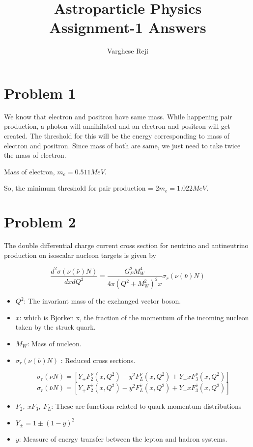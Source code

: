 \documentclass[a4paper,11pt]{article}
\author{Varghese Reji}
\date{}
\title{\small{Astroparticle Physics}\\ \Large{Assignment-1 Answers}}
\begin{document}
\maketitle

\section*{Problem 1}
\label{sec:org9f518d5}


We know that electron and positron have same mass. While happening pair production, a photon will annihilated and an electron and positron will  get created. The threshold for this will be the energy corresponding to mass of electron and positron. Since mass of both are same, we just need to take twice the mass of electron.

Mass of electron, \(m_e=0.511MeV\).

So, the minimum threshold for pair production = \(2m_e=1.022MeV\).

\section*{Problem 2}
\label{sec:org3168aad}

The double differential charge current cross section for neutrino and antineutrino production on isoscalar nucleon targets is given by

\begin{equation*}
\frac{d^2 \sigma(\nu(\bar{\nu}) N)}{dx dQ^2} = \frac{G_F^2 M_W^4}{4\pi\left(Q^2+M_W^2\right)^2x}\sigma_r(\nu(\bar{\nu})N)
\end{equation*}

\begin{itemize}
\item \(Q^2\): The invariant mass of the exchanged vector boson.
\item \(x\): which is Bjorken x, the fraction of the momentum of the incoming nucleon taken by the struck quark.
\item \(M_W\): Mass of nucleon.
\item \(\sigma_r(\nu (\bar{\nu}) N)\) : Reduced cross sections.

$$\sigma_r (\nu N) = \left[Y_+F_2^{\nu}(x,Q^2)-y^2F_L^{\nu}(x,Q^2)+Y_-xF_3^{\nu}(x,Q^2) \right]$$
  $$\sigma_r(\bar{\nu} N) = \left[Y_+F_2^{\bar{\nu}}(x,Q^2) -y^2F_L^{\bar{\nu}}(x,Q^2) +Y_-xF_3^{\bar{\nu}}(x,Q^2)\right]$$

\item \(F_2, ~xF_3,~F_L\): These are functions related to quark momentum distributions

\item \(Y_{\pm} = 1\pm (1-y)^2\)

\item \(y\): Measure of energy transfer between the lepton and hadron systems.
\end{itemize}
\end{document}
